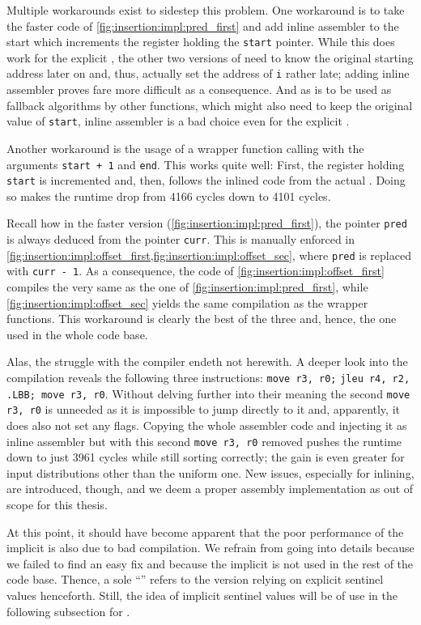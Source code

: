 Multiple workarounds exist to sidestep this problem.
One workaround is to take the faster code of \cref{fig:insertion:impl:pred_first} and add inline assembler to the start which increments the register holding the \lstinline|start| pointer.
While this does work for the explicit \IS{}, the other two versions of \IS{} need to know the original starting address later on and, thus, actually set the address of \lstinline|i| rather late;
adding inline assembler proves fare more difficult as a consequence.
And as \IS{} is to be used as fallback algorithms by other functions, which might also need to keep the original value of \lstinline|start|, inline assembler is a bad choice even for the explicit \IS{}.

Another workaround is the usage of a wrapper function calling \IS{} with the arguments \lstinline|start + 1| and \lstinline|end|.
This works quite well:
First, the register holding \lstinline|start| is incremented and, then, follows the inlined code from the actual \IS{}.
Doing so makes the runtime drop from 4166 cycles down to 4101 cycles.

Recall how in the faster version (\cref{fig:insertion:impl:pred_first}), the pointer \lstinline|pred| is always deduced from the pointer \lstinline|curr|.
This is manually enforced in \cref{fig:insertion:impl:offset_first,fig:insertion:impl:offset_sec}, where \lstinline|pred| is replaced with \lstinline|curr - 1|.
As a consequence, the code of \cref{fig:insertion:impl:offset_first} compiles the very same as the one of \cref{fig:insertion:impl:pred_first}, while \cref{fig:insertion:impl:offset_sec} yields the same compilation as the wrapper functions.
This workaround is clearly the best of the three and, hence, the one used in the whole code base.

Alas, the struggle with the compiler endeth not herewith.
A deeper look into the compilation reveals the following three instructions:
\lstinline|move r3, r0;| \lstinline|jleu r4, r2,| \lstinline|.LBB; move r3, r0|.
Without delving further into their meaning \Dash the second \lstinline|move r3, r0| is unneeded as it is impossible to jump directly to it and, apparently, it does also not set any flags.
Copying the whole assembler code and injecting it as inline assembler but with this second \lstinline|move r3, r0| removed pushes the runtime down to just 3961 cycles while still sorting correctly;
the gain is even greater for input distributions other than the uniform one.
New issues, especially for inlining, are introduced, though, and we deem a proper assembly implementation as out of scope for this thesis.

At this point, it should have become apparent that the poor performance of the implicit \IS{} is also due to bad compilation.
We refrain from going into details because we failed to find an easy fix and because the implicit \IS{} is not used in the rest of the code base.
Thence, a sole \enquote{\IS{}} refers to the version relying on explicit sentinel values henceforth.
Still, the idea of implicit sentinel values will be of use in the following subsection for \ShS{}.
